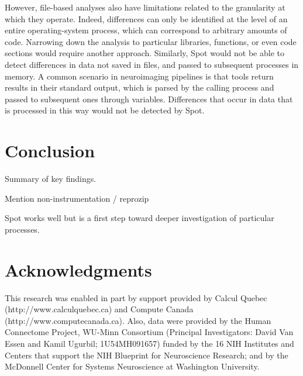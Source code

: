 \documentclass[a4paper,num-refs]{oup-contemporary}
\newcommand{\toolname}[0]{Spot\xspace}
\begin{document}
However, file-based analyses also have limitations related to the
granularity at which they operate. Indeed, differences can only be
identified at the level of an entire operating-system process, which can
correspond to arbitrary amounts of code. Narrowing down the analysis to
particular libraries, functions, or even code sections would require
another approach. Similarly, \toolname would not be able to detect
differences in data not saved in files, and passed to subsequent processes
in memory. A common scenario in neuroimaging pipelines is that tools return
results in their standard output, which is parsed by the calling process
and passed to subsequent ones through variables. Differences that occur in data 
that is processed in this way would not be detected by \toolname.  

\section{Conclusion}

Summary of key findings. 

Mention non-instrumentation / reprozip

Spot works well but is a first step toward deeper investigation of 
particular processes.

\section{Acknowledgments}

This research was enabled in part by support provided by 
Calcul Quebec (http://www.calculquebec.ca) and 
Compute Canada (http://www.computecanada.ca).
Also, data were provided by the Human Connectome Project, WU-Minn 
Consortium (Principal Investigators: David Van Essen and Kamil Ugurbil; 
1U54MH091657) funded by the 16 NIH Institutes and Centers that support 
the NIH Blueprint for Neuroscience Research; and by the McDonnell 
Center for Systems Neuroscience at Washington University.








\end{document}
